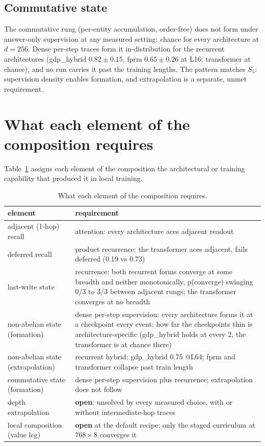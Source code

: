 \documentclass[11pt]{article}
\newcommand{\Sfive}{$S_5$}
\begin{document}
\subsection{Commutative state}

The commutative rung (per-entity accumulation, order-free) does not form under answer-only
supervision at any measured setting: chance for every architecture at $d=256$. Dense per-step
traces form it in-distribution for the recurrent architectures (gdp\_hybrid $0.82 \pm 0.15$,
fprm $0.65 \pm 0.26$ at L16; transformer at chance), and no run carries it past the training
lengths. The pattern matches \Sfive: supervision density enables formation, and extrapolation is a
separate, unmet requirement.

\section{What each element of the composition requires}

Table~\ref{tab:price} assigns each element of the composition the architectural or training capability that produced it in local training.

\begin{table}[h]
\centering
\small
\begin{tabular}{lp{9.5cm}}
\toprule
element & requirement \\
\midrule
adjacent (1-hop) recall & attention: every architecture aces adjacent readout \\
deferred recall & product recurrence: the transformer aces adjacent, fails deferred (0.19 vs 0.73) \\
last-write state & recurrence: both recurrent forms converge at some breadth and neither monotonically, p(converge) swinging 0/3 to 3/3 between adjacent rungs; the transformer converges at no breadth \\
non-abelian state (formation) & dense per-step supervision: every architecture forms it at a checkpoint every event; how far the checkpoints thin is architecture-specific (gdp\_hybrid holds at every 2, the transformer is at chance there) \\
non-abelian state (extrapolation) & recurrent hybrid: gdp\_hybrid 0.75 @L64; fprm and transformer collapse past train length \\
commutative state (formation) & dense per-step supervision plus recurrence; extrapolation does not follow \\
depth extrapolation & \textbf{open}: unsolved by every measured choice, with or without intermediate-hop traces \\
local composition (value leg) & \textbf{open} at the default recipe: only the staged curriculum at $768\times8$ converges it \\
\bottomrule
\end{tabular}
\caption{What each element of the composition requires.}
\label{tab:price}
\end{table}
\end{document}
